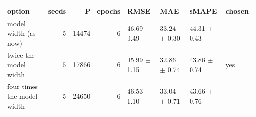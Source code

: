 \begin{tabular}{lrrrllll}
\toprule
option & seeds & P & epochs & RMSE & MAE & sMAPE & chosen \\
\midrule
model width (as now) & 5 & 14474 & 6 & 46.69 $\pm$ 0.49 & 33.24 $\pm$ 0.30 & 44.31 $\pm$ 0.43 &  \\
twice the model width & 5 & 17866 & 6 & 45.99 $\pm$ 1.15 & 32.86 $\pm$ 0.74 & 43.86 $\pm$ 0.74 & yes \\
four times the model width & 5 & 24650 & 6 & 46.53 $\pm$ 1.10 & 33.04 $\pm$ 0.71 & 43.66 $\pm$ 0.76 &  \\
\bottomrule
\end{tabular}
